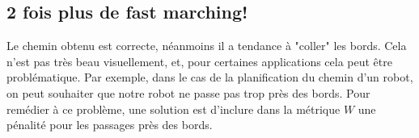 \documentclass{article}
\begin{document}
\subsection{2 fois plus de fast marching!}
Le chemin obtenu est correcte, néanmoins il a tendance à "coller" les bords. Cela n'est pas très beau visuellement, et, pour certaines applications cela peut être problématique. Par exemple, dans le cas de la planification du chemin d'un robot, on peut souhaiter  que notre robot ne passe pas trop près des bords. Pour remédier à ce problème, une solution est d'inclure dans la métrique $W$ une pénalité pour les passages près des bords.
\end{document}
